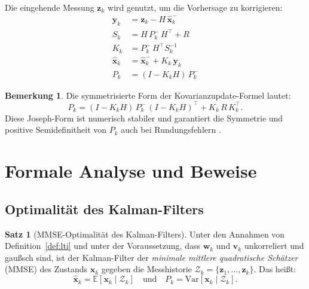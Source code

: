 ﻿\documentclass[a4paper,12pt]{article}
\theoremstyle{definition}
\newtheorem{satz}{Satz}
\newtheorem{bemerkung}{Bemerkung}
\begin{document}
Die eingehende Messung $\mathbf{z}_k$ wird genutzt, um die Vorhersage zu korrigieren:
\begin{align}
    \mathbf{y}_k   &= \mathbf{z}_k - H\,\hat{\mathbf{x}}_k^-
        \label{eq:innov} \\
    S_k             &= H\,P_k^-\,H^\top + R
        \label{eq:innov_cov} \\
    K_k             &= P_k^-\,H^\top S_k^{-1}
        \label{eq:gain} \\
    \hat{\mathbf{x}}_k &= \hat{\mathbf{x}}_k^- + K_k\,\mathbf{y}_k
        \label{eq:update_state} \\
    P_k             &= (I - K_k H)\,P_k^-
        \label{eq:update_cov}
\end{align}

\begin{bemerkung}
    Die symmetrisierte Form der Kovarianz\-update-Formel lautet:
    \[
        P_k = (I - K_k H)\,P_k^-\,(I - K_k H)^\top + K_k\,R\,K_k^\top.
    \]
    Diese Joseph-Form ist numerisch stabiler und garantiert die Symmetrie und
    positive Semidefinitheit von $P_k$ auch bei Rundungsfehlern \cite{joseph1968}.
\end{bemerkung}

\section{Formale Analyse und Beweise}

\subsection{Optimalität des Kalman-Filters}

\begin{satz}[MMSE-Optimalität des Kalman-Filters]
\label{satz:mmse}
    Unter den Annahmen von Definition~\ref{def:lti} und unter der Voraussetzung, dass
    $\mathbf{w}_k$ und $\mathbf{v}_k$ unkorreliert und gaußsch sind, ist der Kalman-Filter
    der \emph{minimale mittlere quadratische Schätzer} (MMSE) des Zustands $\mathbf{x}_k$
    gegeben die Messhistorie $\mathcal{Z}_k = \{\mathbf{z}_1, \ldots, \mathbf{z}_k\}$.
    Das heißt:
    \[
        \hat{\mathbf{x}}_k = \mathbb{E}[\mathbf{x}_k \mid \mathcal{Z}_k]
        \quad \text{und} \quad
        P_k = \mathrm{Var}[\mathbf{x}_k \mid \mathcal{Z}_k].
    \]
\end{satz}
\end{document}
